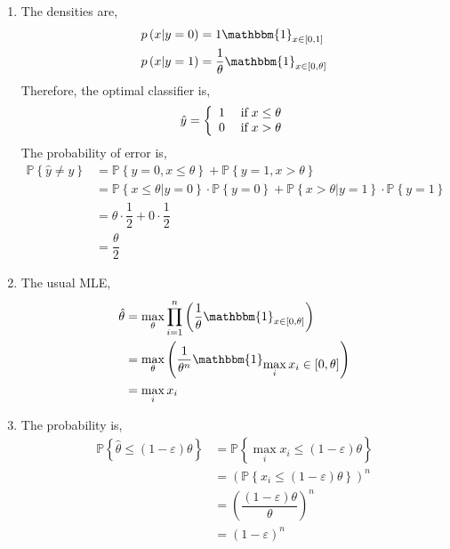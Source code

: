 \documentclass{article}
\begin{document}
\begin{enumerate}
\item The densities are,
\begin{align*}
p\left(x | y = 0\right)  &= 1 \mathbbm{1}_{x \in \left[0, 1\right]}
\\ p\left(x | y = 1\right)  &= \dfrac{1}{\theta} \mathbbm{1}_{x \in \left[0, \theta\right]}
\end{align*}
Therefore, the optimal classifier is,
\[ \hat{y} =\left\{ \begin{array}{ll}
1& \text{\;if\;} x \leq  \theta \\
0& \text{\;if\;} x > \theta \\
\end{array}\right. \]
The probability of error is,
\begin{align*}
\mathbb{P}\left\{\hat{y} \neq  y\right\} &= \mathbb{P}\left\{y = 0, x \leq  \theta\right\} + \mathbb{P}\left\{y = 1, x > \theta\right\}
\\ &= \mathbb{P}\left\{x \leq  \theta | y = 0\right\} \cdot  \mathbb{P}\left\{y = 0\right\} + \mathbb{P}\left\{x > \theta | y = 1\right\} \cdot  \mathbb{P}\left\{y = 1\right\}
\\ &= \theta \cdot  \dfrac{1}{2} + 0 \cdot  \dfrac{1}{2}
\\ &= \dfrac{\theta}{2}
\end{align*}
\item The usual MLE,
\begin{align*}
\hat{\theta} &= \displaystyle\max_{\theta} \displaystyle\prod_{i=1}^{n} \left(\dfrac{1}{\theta} \mathbbm{1}_{x \in \left[0, \theta\right]}\right)
\\ &= \displaystyle\max_{\theta} \left(\dfrac{1}{\theta^{n}} \mathbbm{1}_{\displaystyle\max_{i} x_{i} \in \left[0, \theta\right]}\right)
\\ &= \displaystyle\max_{i} x_{i}
\end{align*}
\item The probability is,
\begin{align*}
\mathbb{P}\left\{\hat{\theta} \leq  \left(1 - \varepsilon\right) \theta\right\} &= \mathbb{P}\left\{\displaystyle\max_{i} x_{i} \leq  \left(1 - \varepsilon\right) \theta\right\}
\\ &= \left(\mathbb{P}\left\{x_{i} \leq  \left(1 - \varepsilon\right) \theta\right\}\right)^{n}
\\ &= \left(\dfrac{\left(1 - \varepsilon\right) \theta}{\theta}\right)^{n}
\\ &= \left(1 - \varepsilon\right)^{n}

\end{align*}
\end{enumerate}
\end{document}
